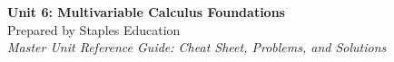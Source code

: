 




\begin{center}
    {\LARGE \bfseries Unit 6: Multivariable Calculus Foundations}\\[6pt]
    {\large Prepared by Staples Education}\\[4pt]
    {\itshape Master Unit Reference Guide: Cheat Sheet, Problems, and Solutions}
\end{center}

\vspace{0.4em}

\tableofcontents

\vspace{0.4em}

